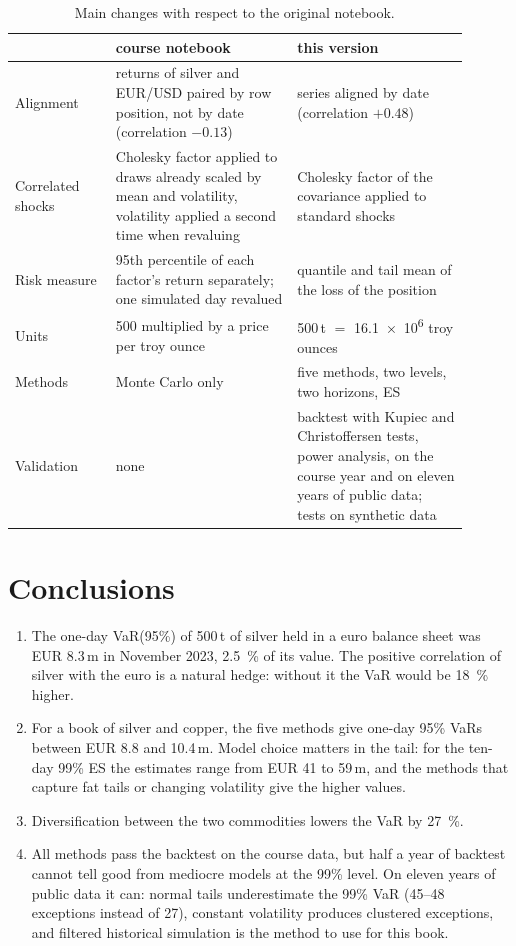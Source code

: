 \documentclass[11pt,a4paper]{article}
\begin{document}
\begin{table}[H]
  \centering\small
  \caption{Main changes with respect to the original notebook.}
  \label{tab:changes}
  \begin{tabular}{p{0.2\linewidth}p{0.36\linewidth}p{0.34\linewidth}}
    \toprule
    & course notebook & this version \\
    \midrule
    Alignment & returns of silver and EUR/USD paired by row position, not by date (correlation $-0.13$) & series
      aligned by date (correlation $+0.48$) \\
    Correlated shocks & Cholesky factor applied to draws already scaled by mean and volatility, volatility applied
      a second time when revaluing & Cholesky factor of the covariance applied to standard shocks \\
    Risk measure & 95th percentile of each factor's return separately; one simulated day revalued & quantile and
      tail mean of the loss of the position \\
    Units & 500 multiplied by a price per troy ounce & 500\,t $=$ \num{16.1e6} troy ounces \\
    Methods & Monte Carlo only & five methods, two levels, two horizons, ES \\
    Validation & none & backtest with Kupiec and Christoffersen tests, power analysis, on the course year and on eleven years of public data; tests on synthetic data \\
    \bottomrule
  \end{tabular}
\end{table}

\section{Conclusions}

\begin{enumerate}
  \item The one-day VaR(95\%) of 500\,t of silver held in a euro balance sheet was EUR 8.3\,m in November 2023,
    \SI{2.5}{\percent} of its value. The positive correlation of silver with the euro is a natural hedge: without it
    the VaR would be \SI{18}{\percent} higher.
  \item For a book of silver and copper, the five methods give one-day 95\% VaRs between EUR 8.8 and 10.4\,m.
    Model choice matters in the tail: for the ten-day 99\% ES the estimates range from EUR 41 to 59\,m, and the
    methods that capture fat tails or changing volatility give the higher values.
  \item Diversification between the two commodities lowers the VaR by \SI{27}{\percent}.
  \item All methods pass the backtest on the course data, but half a year of backtest cannot tell good from mediocre
    models at the 99\% level. On eleven years of public data it can: normal tails underestimate the 99\% VaR
    (45--48 exceptions instead of 27), constant volatility produces clustered exceptions, and filtered historical
    simulation is the method to use for this book.
\end{enumerate}



\end{document}
